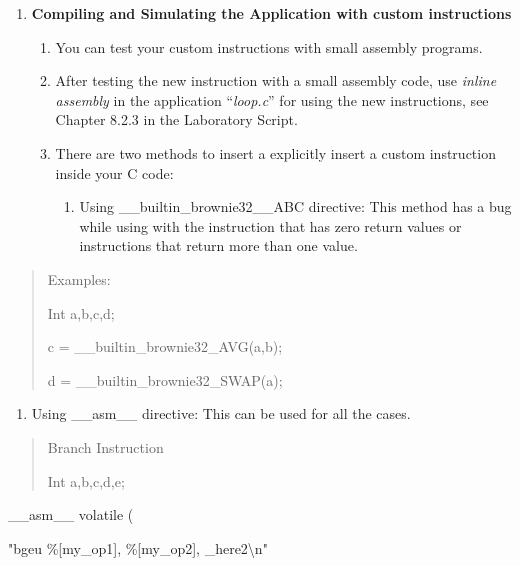 \documentclass[
]{article}
\begin{document}
\begin{enumerate}
\def\labelenumi{\arabic{enumi}.}
\setcounter{enumi}{4}
\item
  \textbf{Compiling and Simulating the Application with custom
  instructions}

  \begin{enumerate}
  \def\labelenumii{\arabic{enumii}.}
  \item
    You can test your custom instructions with small assembly programs.
  \item
    After testing the new instruction with a small assembly code, use
    \emph{inline assembly} in the application ``\emph{loop.c}'' for
    using the new instructions, see Chapter 8.2.3 in the Laboratory
    Script.
  \item
    There are two methods to insert a explicitly insert a custom
    instruction inside your C code:

    \begin{enumerate}
    \def\labelenumiii{\arabic{enumiii}.}
    \item
      Using \_\_builtin\_brownie32\_\_ABC directive: This method has a
      bug while using with the instruction that has zero return values
      or instructions that return more than one value.
    \end{enumerate}
  \end{enumerate}
\end{enumerate}

\begin{quote}
Examples:

Int a,b,c,d;

c = \_\_builtin\_brownie32\_AVG(a,b);

d = \_\_builtin\_brownie32\_SWAP(a);
\end{quote}

\begin{enumerate}
\def\labelenumi{\arabic{enumi}.}
\setcounter{enumi}{1}
\item
  Using \_\_asm\_\_ directive: This can be used for all the cases.
\end{enumerate}

\begin{quote}
Branch Instruction

Int a,b,c,d,e;
\end{quote}

\_\_asm\_\_ volatile (

"bgeu \%{[}my\_op1{]}, \%{[}my\_op2{]}, \_here2\textbackslash n"
\end{document}
